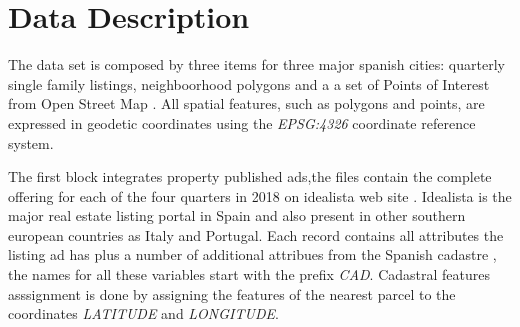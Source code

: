 \documentclass[times,final]{elsarticle}
\begin{document}
\section*{Data Description}

\noindent

The data set is composed by three items for three major spanish cities: quarterly single family listings, neighboorhood polygons and a a set of Points of Interest from Open Street Map \cite{OpenStreetMap}. All spatial features, such as polygons and points, are expressed in geodetic coordinates using the \emph{EPSG:4326} coordinate reference system.

The first block integrates property published ads,the files contain the complete offering for each of the four quarters in 2018 on idealista web site \cite{idealista}. Idealista is the major real estate listing portal in Spain and also present in other southern european countries as Italy and Portugal. Each record contains all attributes the listing ad has plus a number of additional attribues from the Spanish cadastre \cite{Catastro}, the names for all these variables start with the prefix \emph{CAD}. Cadastral features asssignment is done by assigning the features of the nearest parcel to the coordinates \emph{LATITUDE} and \emph{LONGITUDE}.
\end{document}
